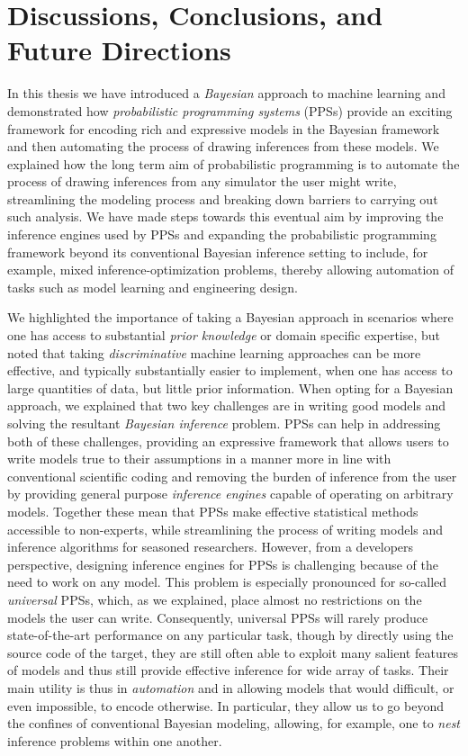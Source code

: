 
\chapter{Discussions, Conclusions, and Future Directions}
\label{chp:discussion}

In this thesis we have introduced a \emph{Bayesian} approach to machine learning and demonstrated
how \emph{probabilistic programming systems} (PPSs) provide an exciting framework for
encoding rich and expressive models in the Bayesian framework and then automating the process
of drawing inferences from these models.  We explained how the long term
aim of probabilistic programming is to automate the process of drawing inferences from any simulator
the user might write, streamlining the modeling process and breaking down barriers to carrying out such
analysis.  We have made steps towards this eventual aim by improving the inference
engines used by PPSs and expanding the probabilistic programming framework beyond its conventional
Bayesian inference setting to include, for example, 
mixed inference-optimization problems, thereby
allowing automation of tasks such as model learning and engineering design.

We highlighted the importance of taking a Bayesian approach in scenarios where one has
access to substantial \emph{prior knowledge} or domain specific expertise, but noted that taking
\emph{discriminative} machine learning approaches can be more effective, and typically substantially
easier to implement, when one has access to large quantities of data, but little prior information.
When opting for a Bayesian approach, we explained that two key challenges are in writing good models
and solving the resultant \emph{Bayesian inference} problem.
PPSs can help in addressing both of these challenges, providing an expressive framework
that allows users to write models true to their assumptions in a manner more in line with conventional
scientific coding and removing the burden of inference from the user by providing general
purpose \emph{inference engines} capable of operating on arbitrary models.
Together these mean that PPSs make effective statistical methods accessible to non-experts, while
streamlining the process of writing models and inference algorithms for seasoned researchers.
However, from a developers perspective, designing inference engines for PPSs is challenging because of
 the need to work on any model.
 This problem is especially pronounced
for so-called \emph{universal} PPSs, which, as we explained, place almost no restrictions on the
models the user can write.  Consequently,
universal PPSs will rarely produce state-of-the-art performance on any particular task, though
by directly using the source code of the target, they are still often able to exploit many salient
features of models and thus still provide effective inference for wide array of tasks.
  Their main
utility is thus in \emph{automation} and in allowing models that would difficult, or even impossible,
to encode otherwise.  In particular, they allow us to go beyond
the confines of conventional Bayesian  modeling, allowing, for example, one to \emph{nest} 
inference problems within one another.

